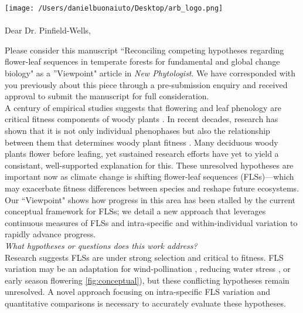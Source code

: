 \documentclass[11.5 pt]{article}\usepackage[]{graphicx}\usepackage[]{color}
\begin{document}

\def\labelitemi{--}
\parindent=24pt
\texttt{[image: /Users/danielbuonaiuto/Desktop/arb\_logo.png]}
\\\\

{Dear Dr. Pinfield-Wells,}\\
\vspace{1.5ex}

\noindent Please consider this manuscript ``Reconciling competing hypotheses regarding flower-leaf sequences in temperate forests for fundamental and global change biology" as a ''Viewpoint" article in \textit{New Phytologist}. We have corresponded with you previously about this piece through a pre-submission enquiry and received approval to submit the manuscript for full consideration.\\

\noindent A century of empirical studies suggests that flowering and leaf phenology are critical fitness components of woody plants \citep{Munguia-Rosas2011,Forrest2010}. In recent decades, research has shown that it is not only individual phenophases but also the relationship between them that determines woody plant fitness \citep{Menzel1999,Ettinger2018}. Many deciduous woody plants flower before leafing, yet sustained research efforts have yet to yield a consistant, well-supported explanation for this. These unresolved hypotheses are important now as climate change is shifting flower-leaf sequences (FLSs)---which may exacerbate fitness differences between species and reshape future ecosystems. Our ``Viewpoint" shows how progress in this area has been stalled by the current conceptual framework for FLSs; we detail a new approach that leverages continuous measures of FLSs and intra-specific and within-individual variation to rapidly advance progress.\\

\noindent \emph{What hypotheses or questions does this work address?}\\
\noindent Research suggests FLSs are under strong selection and critical to fitness. FLS variation may be an adaptation for wind-pollination \citep{Rathcke_1985}, reducing water stress \citep{Gougherty2018,Reich1984}, or early season flowering \citep{Primack1987} \ref{fig:conceptual}), but these conflicting hypotheses remain unresolved. A novel approach focusing on intra-specific FLS variation and quantitative comparisons is necessary to accurately evaluate these hypotheses.\\
\end{document}

